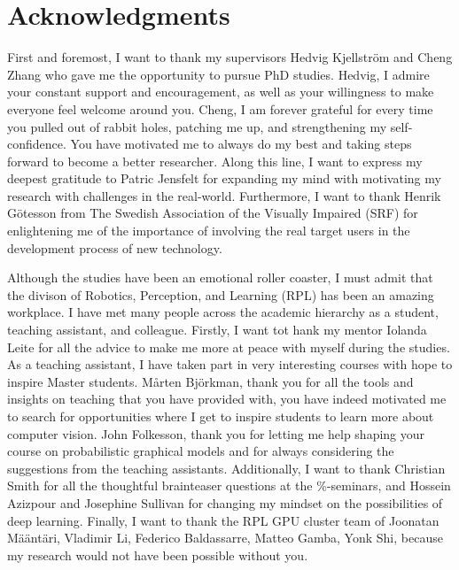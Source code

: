 
\chapter{Acknowledgments}
\label{chap:acknowledgements}

\noindent First and foremost, I want to thank my supervisors Hedvig Kjellström and Cheng Zhang who gave me the opportunity to pursue PhD studies. Hedvig, I admire your constant support and encouragement, as well as your willingness to make everyone feel welcome around you. Cheng, I am forever grateful for every time you pulled out of rabbit holes, patching me up, and strengthening my self-confidence. You have motivated me to always do my best and taking steps forward to become a better researcher. 
Along this line, I want to express my deepest gratitude to Patric Jensfelt for expanding my mind with motivating my research with challenges in the real-world. Furthermore, I want to thank Henrik Götesson from The Swedish Association of the Visually Impaired (SRF) for enlightening me of the importance of involving the real target users in the development process of new technology. 
\newline 

 
\noindent Although the studies have been an emotional roller coaster, I must admit that the divison of Robotics, Perception, and Learning (RPL) has been an amazing workplace. I have met many people across the academic hierarchy as a student, teaching assistant, and colleague. Firstly, I want tot hank my mentor Iolanda Leite for all the advice to make me more at peace with myself during the studies. As a teaching assistant, I have taken part in very interesting courses with hope to inspire Master students. Mårten Björkman, thank you for all the tools and insights on teaching that you have provided with, you have indeed motivated me to search for opportunities where I get to inspire students to learn more about computer vision. John Folkesson, thank you for letting me help shaping your course on probabilistic graphical models and for always considering the suggestions from the teaching assistants. Additionally, I want to thank Christian Smith for all the thoughtful brainteaser questions at the \%-seminars, and Hossein Azizpour and Josephine Sullivan for changing my mindset on the possibilities of deep learning. Finally, I want to thank the RPL GPU cluster team of Joonatan Määntäri, Vladimir Li, Federico Baldassarre, Matteo Gamba, Yonk Shi, because my research would not have been possible without you.  
\newline 

